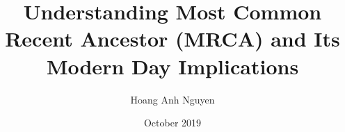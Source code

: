 \documentclass{article}
\title{Understanding Most Common Recent Ancestor (MRCA) and Its Modern Day Implications}
\author{Hoang Anh Nguyen}
\date{October 2019}
\begin{document}
\maketitle

\section{}
\end{document}
